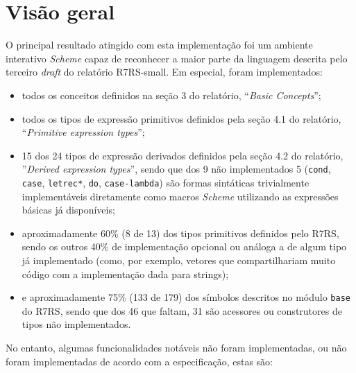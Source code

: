 \section{Visão geral}
\label{sec:introducao-resultados}

O principal resultado atingido com esta implementação foi um ambiente interativo
\textit{Scheme} capaz de reconhecer a maior parte da linguagem descrita pelo 
terceiro \textit{draft} do relatório \acs{R7RS}-small. Em especial, foram
implementados:

\begin{itemize}

\item todos os conceitos definidos na seção 3 do relatório, ``\textit{Basic
Concepts}'';

\item todos os tipos de expressão primitivos definidos pela seção 4.1 do
relatório, ``\textit{Primitive expression types}'';

\item 15 dos 24 tipos de expressão derivados definidos pela seção 4.2 do
relatório, ''\textit{Derived expression types}'', sendo que dos 9 não
implementados 5 (\texttt{cond}, \texttt{case}, \texttt{letrec*}, \texttt{do},
\texttt{case-lambda}) são formas sintáticas trivialmente implementáveis
diretamente como macros \textit{Scheme} utilizando as expressões básicas já
disponíveis;

\item aproximadamente 60\% (8 de 13) dos tipos primitivos definidos pelo \acs{R7RS}, sendo
 os outros 40\% de implementação opcional ou análoga a de algum tipo já
implementado (como, por exemplo, vetores que compartilhariam muito código com
a implementação dada para strings);

\item e aproximadamente 75\% (133 de 179) dos símbolos descritos no módulo
\texttt{base} do \acs{R7RS}, sendo que dos 46 que faltam, 31 são acessores ou
construtores de tipos não implementados.

\end{itemize}

No entanto, algumas funcionalidades notáveis não foram implementadas, ou não foram
implementadas de acordo com a especificação, estas são:

